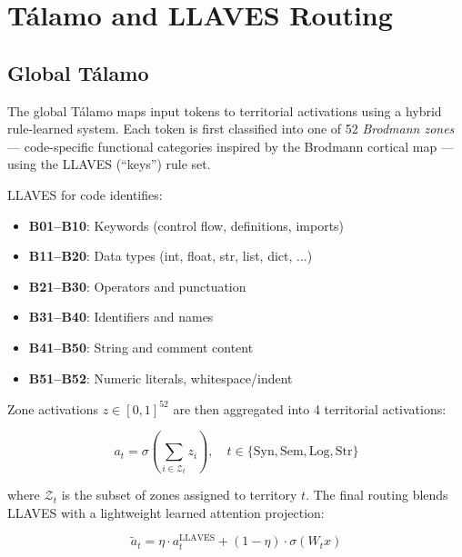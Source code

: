 \documentclass[11pt,a4paper]{article}
\begin{document}
\section{Tálamo and LLAVES Routing}
\label{sec:talamo}

\subsection{Global Tálamo}

The global Tálamo maps input tokens to territorial activations using a hybrid
rule-learned system.  Each token is first classified into one of 52
\emph{Brodmann zones} — code-specific functional categories inspired by the
Brodmann cortical map — using the LLAVES (``keys'') rule set.

LLAVES for code identifies:
\begin{itemize}\setlength\itemsep{2pt}
    \item \textbf{B01--B10}: Keywords (control flow, definitions, imports)
    \item \textbf{B11--B20}: Data types (int, float, str, list, dict, ...)
    \item \textbf{B21--B30}: Operators and punctuation
    \item \textbf{B31--B40}: Identifiers and names
    \item \textbf{B41--B50}: String and comment content
    \item \textbf{B51--B52}: Numeric literals, whitespace/indent
\end{itemize}

Zone activations $z \in [0,1]^{52}$ are then aggregated into 4 territorial
activations:

\begin{equation}
    a_t = \sigma\!\left(\sum_{i \in \mathcal{Z}_t} z_i\right), \quad
    t \in \{\text{Syn}, \text{Sem}, \text{Log}, \text{Str}\}
    \label{eq:territory_agg}
\end{equation}

where $\mathcal{Z}_t$ is the subset of zones assigned to territory $t$.  The
final routing blends LLAVES with a lightweight learned attention projection:

\begin{equation}
    \tilde{a}_t = \eta \cdot a_t^\text{LLAVES}
              + (1-\eta) \cdot \sigma(W_t x)
    \label{eq:hybrid_routing}
\end{equation}
\end{document}

